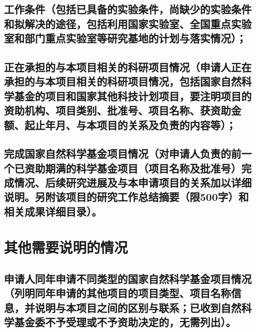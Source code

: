 \documentclass[UTF8, punct, oneside, fontset=none]{ctexbook}
\begin{document}
\begin{MS}
	
\end{MS}

\section{\textbf{工作条件}（包括已具备的实验条件，尚缺少的实验条件和拟解决的途径，包括利用国家实验室、全国重点实验室和部门重点实验室等研究基地的计划与落实情况）；}

\begin{MS}
	
\end{MS}

\section{\textbf{正在承担的与本项目相关的科研项目情况}（申请人正在承担的与本项目相关的科研项目情况，包括国家自然科学基金的项目和国家其他科技计划项目，要注明项目的资助机构、项目类别、批准号、项目名称、\hspace{-2pt}获资助金额、\hspace{-2pt}起止年月、\hspace{-2pt}与本项目的关系及负责的内容等）；}

\begin{MS}
	
\end{MS}

\section{\textbf{完成国家自然科学基金项目情况}（对申请人负责的前一个已资助期满的科学基金项目\kg{-0.1em}（项目名称及批准号）\kg{-0.1em}完成情况、\kg{-0.1em}后续研究进展及与本申请项目的关系加以详细说明。另附该项目的研究工作总结摘要（限500字）和相关成果详细目录）。}

\begin{MS}
	
\end{MS}

\chapter[-3.4pt]{\textbf{其他需要说明的情况}}
\section{申请人同年申请不同类型的国家自然科学基金项目情况（列明同年申请的其他项目的项目类型、项目名称信息，并说明与本项目之间的区别与联系；已收到自然科学基金委不予受理或不予资助决定的，无需列出）。}
\end{document}
